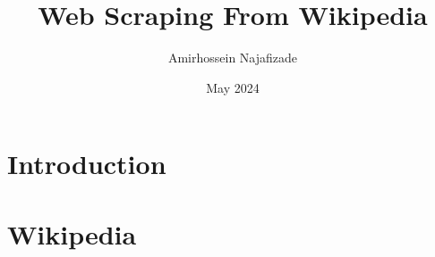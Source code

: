 \documentclass{report}
\author{Amirhossein Najafizade}
\title{Web Scraping From Wikipedia}
\date{May 2024}
\begin{document}
\maketitle

\section{Introduction}

\section{Wikipedia}
\end{document}
